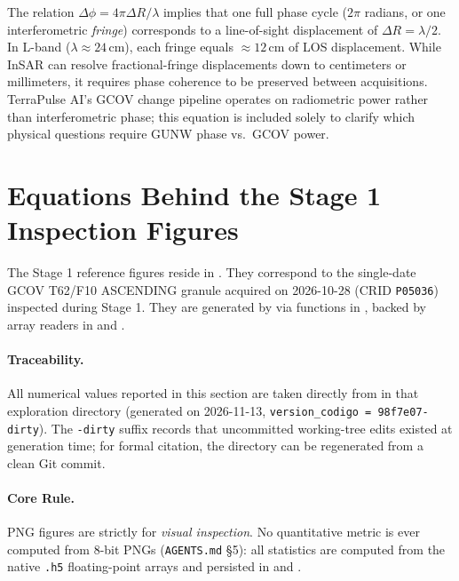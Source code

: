 \documentclass[11pt,a4paper]{article}
\begin{document}
The relation $\Delta\phi=4\pi\Delta R/\lambda$ implies that one full phase cycle ($2\pi$ radians, or one interferometric \emph{fringe}) corresponds to a line-of-sight displacement of $\Delta R=\lambda/2$. In L-band ($\lambda\approx24$\,cm), each fringe equals $\approx12$\,cm of LOS displacement. While InSAR can resolve fractional-fringe displacements down to centimeters or millimeters, it requires phase coherence to be preserved between acquisitions. TerraPulse AI's GCOV change pipeline operates on radiometric power rather than interferometric phase; this equation is included solely to clarify which physical questions require GUNW phase vs.\ GCOV power.

\section{Equations Behind the Stage 1 Inspection Figures}
\label{sec:figuras}

The Stage 1 reference figures reside in
.
They correspond to the single-date GCOV T62/F10 ASCENDING granule acquired on 2026-10-28 (CRID \texttt{P05036}) inspected during Stage 1. They are generated by  via functions in , backed by array readers in  and .

\paragraph{Traceability.} All numerical values reported in this section are taken directly from  in that exploration directory (generated on 2026-11-13, \texttt{version\_codigo = 98f7e07-dirty}). The \texttt{-dirty} suffix records that uncommitted working-tree edits existed at generation time; for formal citation, the directory can be regenerated from a clean Git commit.

\paragraph{Core Rule.} PNG figures are strictly for \emph{visual inspection}. No quantitative metric is ever computed from 8-bit PNGs (\texttt{AGENTS.md} §5): all statistics are computed from the native \texttt{.h5} floating-point arrays and persisted in  and .
\end{document}
